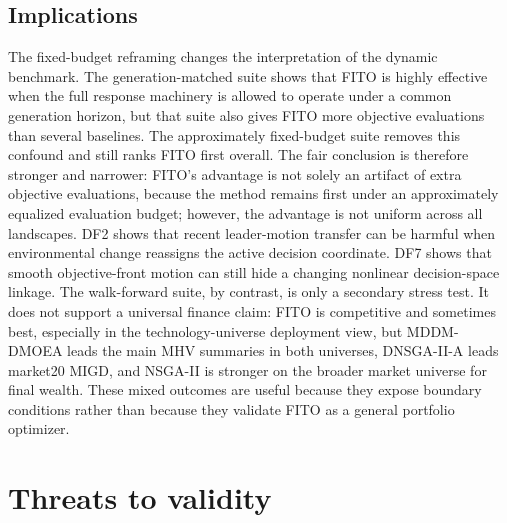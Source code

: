 \documentclass[preprint,12pt]{elsarticle}
\begin{document}
\subsection{Implications}

The fixed-budget reframing changes the interpretation of the dynamic benchmark. The generation-matched suite shows that FITO is highly effective when the full response machinery is allowed to operate under a common generation horizon, but that suite also gives FITO more objective evaluations than several baselines. The approximately fixed-budget suite removes this confound and still ranks FITO first overall. The fair conclusion is therefore stronger and narrower: FITO's advantage is not solely an artifact of extra objective evaluations, because the method remains first under an approximately equalized evaluation budget; however, the advantage is not uniform across all landscapes. DF2 shows that recent leader-motion transfer can be harmful when environmental change reassigns the active decision coordinate. DF7 shows that smooth objective-front motion can still hide a changing nonlinear decision-space linkage. The walk-forward suite, by contrast, is only a secondary stress test. It does not support a universal finance claim: FITO is competitive and sometimes best, especially in the technology-universe deployment view, but MDDM-DMOEA leads the main MHV summaries in both universes, DNSGA-II-A leads market20 MIGD, and NSGA-II is stronger on the broader market universe for final wealth. These mixed outcomes are useful because they expose boundary conditions rather than because they validate FITO as a general portfolio optimizer.

\section{Threats to validity}
\label{sec:validity}
\end{document}
